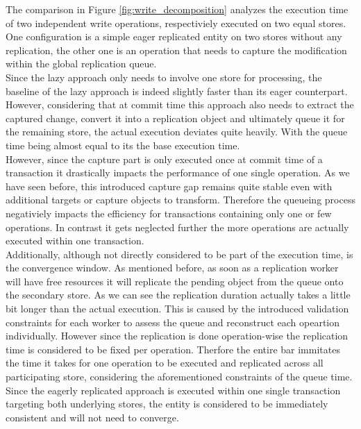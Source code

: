 The comparison in Figure \ref{fig:write_decomposition} analyzes the execution time of two independent write operations, respectiviely executed on two equal stores.
One configuration is a simple eager replicated entity on two stores without any replication, the other one is an operation that needs to capture 
the modification within the global replication queue.\\
Since the lazy approach only needs to involve one store for processing, the baseline of the lazy approach is indeed slightly faster than its eager counterpart.
However, considering that at commit time this approach also needs to extract the captured change, convert it into a replication object and ultimately queue 
it for the remaining store, the actual execution deviates quite heavily. With the queue time being almost equal to its the base execution time.\\
However, since the capture part is only executed once at commit time of a transaction it drastically impacts the performance 
of one single operation.
As we have seen before, this introduced capture gap remains quite stable even with additional targets or capture objects to transform.
Therefore the queueing process negativiely impacts the efficiency for transactions containing only one or few operations.
In contrast it gets neglected further the more operations are actually executed within one transaction.\\
Additionally, although not directly considered to be part of the execution time, is the convergence window. As mentioned before, as soon
as a replication worker will have free resources it will replicate the pending object from the queue onto the secondary store.
As we can see the replication duration actually takes a little bit longer than the actual execution. This is caused by the introduced
validation constraints for each worker to assess the queue and reconstruct each opeartion individually. 
However since the replication is done operation-wise the replication time is considered to be fixed per operation.
Therfore the entire bar immitates the time it takes for one operation to be executed and replicated across all participating store, 
considering the aforementioned constraints of the queue time.
Since the eagerly replicated approach is executed within one single transaction targeting both underlying stores, the entity is 
considered to be immediately consistent and will not need to converge. 






